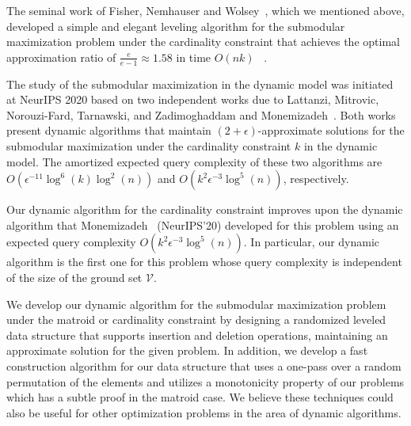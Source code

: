 \documentclass[11pt]{article}
\newcommand{\mO}{O}
\newcommand{\ground}{\ensuremath{\mathcal{V}}}
\begin{document}
The seminal work of Fisher, Nemhauser and Wolsey~\cite{DBLP:journals/mp/NemhauserWF78}, which we mentioned above,
 developed a simple and elegant leveling algorithm for the submodular maximization problem under the cardinality constraint that achieves the optimal approximation ratio of $\frac{e}{e-1} \approx 1.58$ in time $O(nk)$ ~\cite{DBLP:journals/mp/NemhauserWF78,DBLP:journals/jacm/Feige98}.

The study of the submodular maximization in the dynamic model was initiated at NeurIPS 2020 based on two independent works
due to Lattanzi, Mitrovic, Norouzi-Fard, Tarnawski, and Zadimoghaddam \cite{DBLP:conf/nips/LattanziMNTZ20} 
and Monemizadeh~\cite{DBLP:conf/nips/Monemizadeh20}.
Both works present dynamic algorithms 
that maintain $(2+\epsilon)$-approximate solutions for the submodular maximization  under the cardinality constraint $k$ 
in the dynamic model.
The amortized expected query complexity of these two algorithms are 
$\mO(\epsilon^{-11}\log^6(k)\log^2(n))$ and $\mO(k^2\epsilon^{-3}\log^5(n))$, respectively.


Our dynamic algorithm for the cardinality constraint 
improves upon the dynamic algorithm that Monemizadeh~\cite{DBLP:conf/nips/Monemizadeh20} (NeurIPS'20) 
developed for this problem using an expected query complexity $\mO(k^2\epsilon^{-3}\log^5(n))$. 
In particular, our dynamic algorithm is the first one for this problem whose 
query complexity is independent of the size of the ground set $\ground$. 



We develop our dynamic algorithm for the submodular maximization problem under the matroid or cardinality constraint by designing a randomized leveled data structure that supports insertion and deletion operations, maintaining an approximate solution for the given problem. In addition, we develop a fast construction algorithm for our data structure that uses a one-pass over a random permutation of the elements and utilizes a monotonicity property of our problems which has a subtle proof in the matroid case. We believe these techniques could also be useful for other optimization problems in the area of dynamic algorithms.
\end{document}
